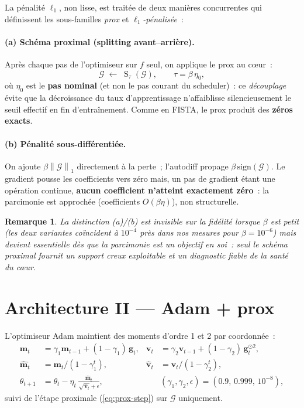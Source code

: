 \documentclass[11pt,a4paper]{article}
\newtheorem{remark}{Remarque}
\newcommand{\T}[1]{\bm{\mathcal{#1}}}          %
\newcommand{\M}[1]{\bm{#1}}                     %
\newcommand{\noru}[1]{\left\lVert #1 \right\rVert_1}
\newcommand{\st}{\operatorname{S}}              %
\begin{document}
La pénalité $\ell_1$, non lisse, est traitée de deux manières concurrentes qui
définissent les sous-familles \emph{prox} et \emph{$\ell_1$-pénalisée}~:

\paragraph{(a) Schéma proximal (splitting avant--arrière).}
Après chaque pas de l'optimiseur sur $f$ seul, on applique le prox au c\oe ur~:
\begin{equation}
  \T{G} \;\longleftarrow\; \st_{\tau}(\T{G}),
  \qquad \tau = \beta\,\eta_0 ,
  \label{eq:prox-step}
\end{equation}
où $\eta_0$ est le \textbf{pas nominal} (et non le pas courant du
scheduler)~: ce \emph{découplage} évite que la décroissance du taux
d'apprentissage n'affaiblisse silencieusement le seuil effectif en fin
d'entraînement. Comme en FISTA, le prox produit des \textbf{zéros exacts}.

\paragraph{(b) Pénalité sous-différentiée.}
On ajoute $\beta\noru{\T{G}}$ directement à la perte~; l'autodiff propage
$\beta\,\mathrm{sign}(\T{G})$. Le gradient pousse les coefficients vers zéro
mais, un pas de gradient étant une opération continue, \textbf{aucun
coefficient n'atteint exactement zéro}~: la parcimonie est approchée
(coefficients $O(\beta\eta)$), non structurelle.

\begin{remark}
La distinction (a)/(b) est invisible sur la fidélité lorsque $\beta$ est
petit (les deux variantes coïncident à $10^{-4}$ près dans nos mesures pour
$\beta=10^{-6}$) mais devient essentielle dès que la parcimonie est un
objectif en soi~: seul le schéma proximal fournit un support creux
exploitable et un diagnostic fiable de la santé du c\oe ur.
\end{remark}

\section{Architecture II --- Adam + prox}
\label{sec:adamprox}

L'optimiseur Adam maintient des moments d'ordre 1 et 2 par coordonnée~:
\begin{align}
  \M{m}_t &= \gamma_1\M{m}_{t-1} + (1-\gamma_1)\,\M{g}_t, &
  \M{v}_t &= \gamma_2\M{v}_{t-1} + (1-\gamma_2)\,\M{g}_t^{\odot 2}, \\
  \hat{\M{m}}_t &= \M{m}_t/(1-\gamma_1^t), &
  \hat{\M{v}}_t &= \M{v}_t/(1-\gamma_2^t), \\
  \theta_{t+1} &= \theta_t - \eta_t\,
  \frac{\hat{\M{m}}_t}{\sqrt{\hat{\M{v}}_t}+\epsilon},
  &&(\gamma_1,\gamma_2,\epsilon)=(0.9,\,0.999,\,10^{-8}),
  \label{eq:adam}
\end{align}
suivi de l'étape proximale (\ref{eq:prox-step}) sur $\T{G}$ uniquement.
\end{document}
